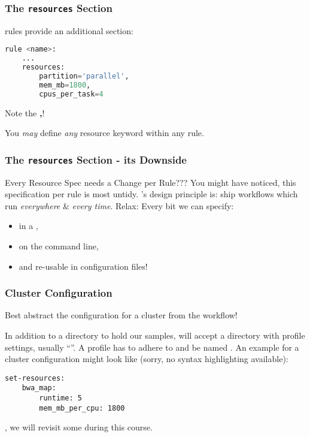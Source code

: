\begin{frame}[fragile]
	\frametitle{The \Snakemake{} \texttt{resources} Section}
	\Snakemake{} rules provide an additional  section:
	\begin{lstlisting}[language=Python,style=Python]
rule <name>:
	...
	resources:
		partition='parallel',
		mem_mb=1800,
		cpus_per_task=4
	\end{lstlisting}
	\begin{hint}
		Note the \textbf{,}!
	\end{hint}
	\pause
	\begin{docs}
		You \emph{may} define \emph{any} resource keyword within any rule.
	\end{docs}
\end{frame}

\begin{frame}
	\frametitle{The \Snakemake{} \texttt{resources} Section - its Downside}
	\begin{block}{Every Resource Spec needs a Change per Rule???}
		You might have noticed, this specification per rule is most untidy. \Snakemake's design principle is: ship workflows which run \emph{everywhere} \& \emph{every time}.
		\newline \pause
		Relax: Every bit we can specify:
		\begin{itemize}
			\item in a ,
			\item on the command line,
			\item and re-usable in configuration files!
		\end{itemize}
	\end{block}
\end{frame} 

\begin{frame}[fragile]
  \frametitle{Cluster Configuration}
  \begin{hint}
  	Best abstract the configuration for a cluster from the workflow!
  \end{hint}
  In addition to a  directory to hold our samples, \Snakemake{} will accept a directory with profile settings, usually ``''.
  \pause
  A profile has to adhere to  and be named . An example for a cluster configuration might look like (sorry, no syntax highlighting available):
  \begin{lstlisting}[style=Plain]
set-resources:
    bwa_map:
        runtime: 5
        mem_mb_per_cpu: 1800
  \end{lstlisting}
  \pause
  
  \Snakemake{} , we will revisit some during this course.

\end{frame}

